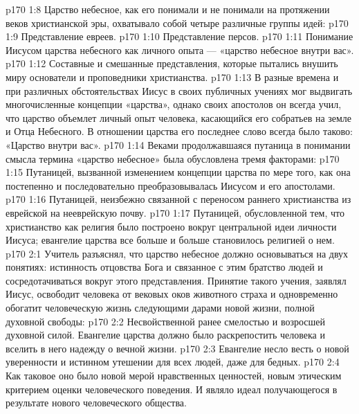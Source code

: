 \vs p170 1:8 Царство небесное, как его понимали и не понимали на протяжении веков христианской эры, охватывало собой четыре различные группы идей:
\vs p170 1:9 \bibnobreakspace Представление евреев.
\vs p170 1:10 \bibnobreakspace Представление персов.
\vs p170 1:11 \bibnobreakspace Понимание Иисусом царства небесного как личного опыта --- «царство небесное внутри вас».
\vs p170 1:12 \bibnobreakspace Составные и смешанные представления, которые пытались внушить миру основатели и проповедники христианства.
\vs p170 1:13 \pc В разные времена и при различных обстоятельствах Иисус в своих публичных учениях мог выдвигать многочисленные концепции «царства», однако своих апостолов он всегда учил, что царство объемлет личный опыт человека, касающийся его собратьев на земле и Отца Небесного. В отношении царства его последнее слово всегда было таково: «Царство внутри вас».
\vs p170 1:14 Веками продолжавшаяся путаница в понимании смысла термина «царство небесное» была обусловлена тремя факторами:
\vs p170 1:15 \bibnobreakspace Путаницей, вызванной изменением концепции царства по мере того, как она постепенно и последовательно преобразовывалась Иисусом и его апостолами.
\vs p170 1:16 \bibnobreakspace Путаницей, неизбежно связанной с переносом раннего христианства из еврейской на нееврейскую почву.
\vs p170 1:17 \bibnobreakspace Путаницей, обусловленной тем, что христианство как религия было построено вокруг центральной идеи личности Иисуса; евангелие царства все больше и больше становилось религией о нем.
\vs p170 2:1 Учитель разъяснял, что царство небесное должно основываться на двух понятиях: истинность отцовства Бога и связанное с этим братство людей и сосредотачиваться вокруг этого представления. Принятие такого учения, заявлял Иисус, освободит человека от вековых оков животного страха и одновременно обогатит человеческую жизнь следующими дарами новой жизни, полной духовной свободы:
\vs p170 2:2 \bibnobreakspace Несвойственной ранее смелостью и возросшей духовной силой. Евангелие царства должно было раскрепостить человека и вселить в него надежду о вечной жизни.
\vs p170 2:3 \bibnobreakspace Евангелие несло весть о новой уверенности и истинном утешении для всех людей, даже для бедных.
\vs p170 2:4 \bibnobreakspace Как таковое оно было новой мерой нравственных ценностей, новым этическим критерием оценки человеческого поведения. И являло идеал получающегося в результате нового человеческого общества.
